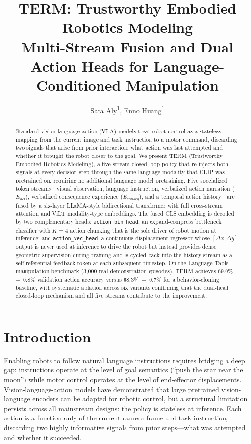 \documentclass[letterpaper]{article} %
\title{TERM: Trustworthy Embodied Robotics Modeling\\Multi-Stream Fusion and Dual Action Heads for Language-Conditioned Manipulation}
\author {
    Sara Aly\textsuperscript{\rm 1},
    Enno Huang\textsuperscript{\rm 1}
}
\begin{document}
\maketitle

\begin{abstract}
Standard vision-language-action (VLA) models treat robot control as a stateless mapping from the current image and task instruction to a motor command, discarding two signals that arise from prior interaction: what action was last attempted and whether it brought the robot closer to the goal. We present TERM (Trustworthy Embodied Robotics Modeling), a five-stream closed-loop policy that re-injects both signals at every decision step through the same language modality that CLIP was pretrained on, requiring no additional language model pretraining. Five specialized token streams---visual observation, language instruction, verbalized action narration ($E_{act}$), verbalized consequence experience ($E_{conseq}$), and a temporal action history---are fused by a six-layer LLaMA-style bidirectional transformer with full cross-stream attention and ViLT modality-type embeddings. The fused CLS embedding is decoded by two complementary heads: \texttt{action\_bin\_head}, an expand-compress bottleneck classifier with $K{=}4$ action chunking that is the sole driver of robot motion at inference; and \texttt{action\_vec\_head}, a continuous displacement regressor whose $[\Delta x, \Delta y]$ output is never used at inference to drive the robot but instead provides dense geometric supervision during training and is cycled back into the history stream as a self-referential feedback token at each subsequent timestep. On the Language-Table manipulation benchmark (3,000 real demonstration episodes), TERM achieves 69.0\%~$\pm$~0.8\% validation action accuracy versus 68.3\%~$\pm$~0.7\% for a behavior-cloning baseline, with systematic ablation across six variants confirming that the dual-head closed-loop mechanism and all five streams contribute to the improvement.
\end{abstract}

\section{Introduction}

Enabling robots to follow natural language instructions requires bridging a deep gap: instructions operate at the level of goal semantics (``push the star near the moon'') while motor control operates at the level of end-effector displacements. Vision-language-action models \cite{brohan2023rt2,black2024pi0,kim2024openvla} have demonstrated that large pretrained vision-language encoders can be adapted for robotic control, but a structural limitation persists across all mainstream designs: the policy is stateless at inference. Each action is a function only of the current camera frame and task instruction, discarding two highly informative signals from prior steps---what was attempted and whether it succeeded.
\end{document}

